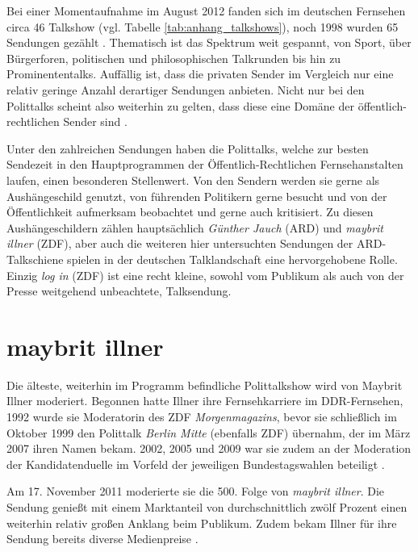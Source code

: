 Bei einer Momentaufnahme im August 2012 fanden sich im deutschen Fernsehen circa 46 Talkshow (vgl. Tabelle \vref{tab:anhang_talkshows}), noch 1998 wurden 65 Sendungen gezählt \parencite[600]{eimerenTalkshowsFormateUnd1998}. Thematisch ist das Spektrum weit gespannt, von Sport, über Bürgerforen, politischen und philosophischen Talkrunden bis hin zu Prominententalks. Auffällig ist, dass die privaten Sender im Vergleich nur eine relativ geringe Anzahl derartiger Sendungen anbieten. Nicht nur bei den Polittalks scheint also weiterhin zu gelten, dass diese eine Domäne der öffentlich-rechtlichen Sender sind \parencite[137]{doernerPolitainmentPolitikMedialen2001}.

Unter den zahlreichen Sendungen haben die Polittalks, welche zur besten Sendezeit in den Hauptprogrammen der Öffentlich-Rechtlichen Fernsehanstalten laufen, einen besonderen Stellenwert. Von den Sendern werden sie gerne als Aushängeschild genutzt, von führenden Politikern gerne besucht und von der Öffentlichkeit aufmerksam beobachtet und gerne auch kritisiert. Zu diesen Aushängeschildern zählen hauptsächlich \textit{Günther Jauch} (ARD) und \textit{maybrit illner} (ZDF), aber auch die weiteren hier untersuchten Sendungen der ARD-Talkschiene spielen in der deutschen Talklandschaft eine hervorgehobene Rolle. Einzig \textit{log in} (ZDF) ist eine recht kleine, sowohl vom Publikum als auch von der Presse weitgehend unbeachtete, Talksendung.

\section{maybrit illner}

Die älteste, weiterhin im Programm befindliche Polittalkshow wird von Maybrit Illner moderiert. Begonnen hatte Illner ihre Fernsehkarriere im DDR-Fernsehen, 1992 wurde sie Moderatorin des ZDF \textit{Morgenmagazins}, bevor sie schließlich im Oktober 1999 den Polittalk \textit{Berlin Mitte} (ebenfalls ZDF) übernahm, der im März 2007 ihren Namen bekam. 2002, 2005 und 2009 war sie zudem an der Moderation der Kandidatenduelle im Vorfeld der jeweiligen Bundestagswahlen beteiligt \parencite{maybritillnerMaybritIllnerGesicht2007}.

Am 17. November 2011 moderierte sie die 500. Folge von \textit{maybrit illner}. Die Sendung  genießt mit einem Marktanteil von durchschnittlich zwölf Prozent \parencite{keilBerlinerSalon2011} einen weiterhin relativ großen Anklang beim Publikum. Zudem bekam Illner für ihre Sendung bereits diverse Medienpreise \parencite[390]{nielandTalkshowisierungWahlkampfesAnalyse2002}.

